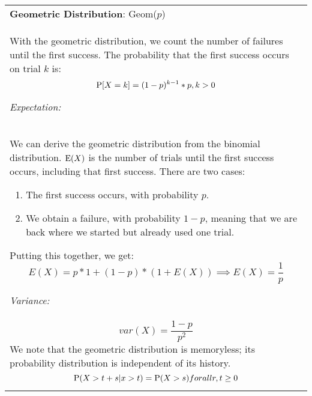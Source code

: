 {\tabulinesep=1mm
\begin{tabu}{|p{16cm} |}
\hline
\textbf{Geometric Distribution}: Geom($p$) \\

With the geometric distribution, we count the number of failures until the first success. The probability that the first success occurs on trial $k$ is:
\[ \P[X = k] = (1 - p)^{k - 1}*p, k > 0\]

\textit{Expectation:} \\
We can derive the geometric distribution from the binomial distribution. $\E(X)$ is the number of trials until the first success occurs, including that first success. There are two cases:
\begin{enumerate}
	\item{The first success occurs, with probability $p$.}
	\item{We obtain a failure, with probability $1-p$, meaning that we are back where we started but already used one trial.}
\end{enumerate}
Putting this together, we get:
$$E(X) = p * 1 + (1-p) * (1 + E(X)) \implies E(X) = \frac{1}{p}$$

\textit{Variance:} \\
$$var(X) = \frac{1-p}{p^2}$$
We note that the geometric distribution is memoryless; its probability distribution is independent of its history. 
\[\P(X > t+s | x > t) = \P(X > s) for all r, t \geq 0 \]
\\
\hline
\end{tabu}
}